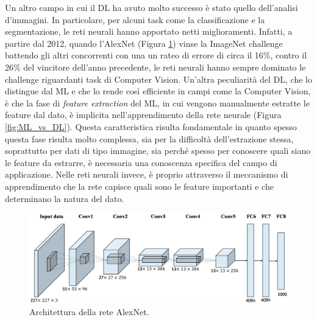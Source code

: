 Un altro campo in cui il DL ha avuto molto successo è stato quello dell'analisi d'immagini. In particolare, per alcuni task come la classificazione e la segmentazione, le reti neurali hanno apportato netti miglioramenti. Infatti, a partire dal 2012, quando l'AlexNet \cite{alexnet} (Figura \ref{fig:alexnet}) vinse la ImageNet challenge battendo gli altri concorrenti con una un rateo di errore di circa il 16\%, contro il 26\% del vincitore dell'anno precedente, le reti neurali hanno sempre dominato le challenge riguardanti task di Computer Vision. 
Un'altra peculiarità del DL, che lo distingue dal ML e che lo rende così efficiente in campi come la Computer Vision, è che la fase di \textit{feature extraction} del ML, in cui vengono manualmente estratte le feature dal dato, è implicita nell'apprendimento della rete neurale (Figura \ref{fig:ML_vs_DL}). Questa caratteristica risulta fondamentale in quanto spesso questa fase risulta molto complessa, sia per la difficoltà dell'estrazione stessa, soprattutto per dati di tipo immagine, sia perché spesso per conoscere quali siano le feature da estrarre, è necessaria una conoscenza specifica del campo di applicazione. Nelle reti neurali invece, è proprio attraverso il meccanismo di apprendimento che la rete capisce quali sono le feature importanti e che determinano la natura del dato.

\begin{figure}[h!]
  \hspace*{0.2in}
  \includegraphics[scale=0.14]{img/alexnet2.png}
  \caption{Architettura della rete AlexNet.}
  \label{fig:alexnet}
\end{figure}

